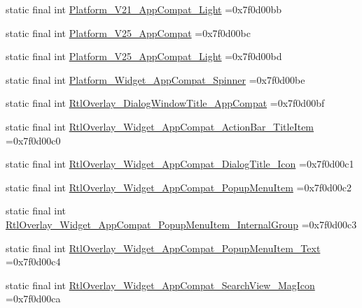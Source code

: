\begin{DoxyCompactItemize}
static final int \mbox{\hyperlink{classbr_1_1unb_1_1cic_1_1mp_1_1marketmaster_1_1R_1_1style_a526b9a907df0dccf305145241c86028a}{Platform\+\_\+\+V21\+\_\+\+App\+Compat\+\_\+\+Light}} =0x7f0d00bb
\item 
static final int \mbox{\hyperlink{classbr_1_1unb_1_1cic_1_1mp_1_1marketmaster_1_1R_1_1style_a231e74651f1afd6a6e2efa0597f615e2}{Platform\+\_\+\+V25\+\_\+\+App\+Compat}} =0x7f0d00bc
\item 
static final int \mbox{\hyperlink{classbr_1_1unb_1_1cic_1_1mp_1_1marketmaster_1_1R_1_1style_ac2d8b71e8fca0fe010796b2c8e3e73be}{Platform\+\_\+\+V25\+\_\+\+App\+Compat\+\_\+\+Light}} =0x7f0d00bd
\item 
static final int \mbox{\hyperlink{classbr_1_1unb_1_1cic_1_1mp_1_1marketmaster_1_1R_1_1style_a2d8e4acfb3abe040048f79ce318e0d43}{Platform\+\_\+\+Widget\+\_\+\+App\+Compat\+\_\+\+Spinner}} =0x7f0d00be
\item 
static final int \mbox{\hyperlink{classbr_1_1unb_1_1cic_1_1mp_1_1marketmaster_1_1R_1_1style_aa721f0e0a67e8ef194e1d0e89988efaa}{Rtl\+Overlay\+\_\+\+Dialog\+Window\+Title\+\_\+\+App\+Compat}} =0x7f0d00bf
\item 
static final int \mbox{\hyperlink{classbr_1_1unb_1_1cic_1_1mp_1_1marketmaster_1_1R_1_1style_ab8191c10a01d351b5295c9239a82ca0a}{Rtl\+Overlay\+\_\+\+Widget\+\_\+\+App\+Compat\+\_\+\+Action\+Bar\+\_\+\+Title\+Item}} =0x7f0d00c0
\item 
static final int \mbox{\hyperlink{classbr_1_1unb_1_1cic_1_1mp_1_1marketmaster_1_1R_1_1style_af447703e897e8f7652828db52373ca71}{Rtl\+Overlay\+\_\+\+Widget\+\_\+\+App\+Compat\+\_\+\+Dialog\+Title\+\_\+\+Icon}} =0x7f0d00c1
\item 
static final int \mbox{\hyperlink{classbr_1_1unb_1_1cic_1_1mp_1_1marketmaster_1_1R_1_1style_a868d11e2d0411a87aa506e8221c6880f}{Rtl\+Overlay\+\_\+\+Widget\+\_\+\+App\+Compat\+\_\+\+Popup\+Menu\+Item}} =0x7f0d00c2
\item 
static final int \mbox{\hyperlink{classbr_1_1unb_1_1cic_1_1mp_1_1marketmaster_1_1R_1_1style_a970be2ed1a4fdf9d296d7c5fd3d5e3a2}{Rtl\+Overlay\+\_\+\+Widget\+\_\+\+App\+Compat\+\_\+\+Popup\+Menu\+Item\+\_\+\+Internal\+Group}} =0x7f0d00c3
\item 
static final int \mbox{\hyperlink{classbr_1_1unb_1_1cic_1_1mp_1_1marketmaster_1_1R_1_1style_a8e53896a716214ede8ccf5066881df15}{Rtl\+Overlay\+\_\+\+Widget\+\_\+\+App\+Compat\+\_\+\+Popup\+Menu\+Item\+\_\+\+Text}} =0x7f0d00c4
\item 
static final int \mbox{\hyperlink{classbr_1_1unb_1_1cic_1_1mp_1_1marketmaster_1_1R_1_1style_a91af31101d86360e539b97340e76e98b}{Rtl\+Overlay\+\_\+\+Widget\+\_\+\+App\+Compat\+\_\+\+Search\+View\+\_\+\+Mag\+Icon}} =0x7f0d00ca

\end{DoxyCompactItemize}
